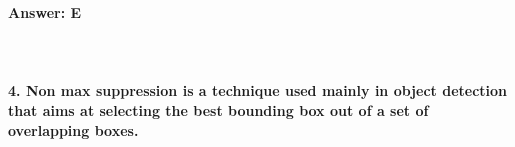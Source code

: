 \documentclass[prl,twocolumn,showpacs,preprintnumbers,superscriptaddress]{revtex4}
\theoremstyle{plain}
\theoremstyle{definition}
\begin{document}
\begin{widetext}
\textbf{Answer: E}
\\
\\
\\
\\
\textbf{4. Non max suppression is a technique used mainly in object detection that aims at selecting the best bounding box out of a set of overlapping boxes.}

\end{widetext}
\end{document}
